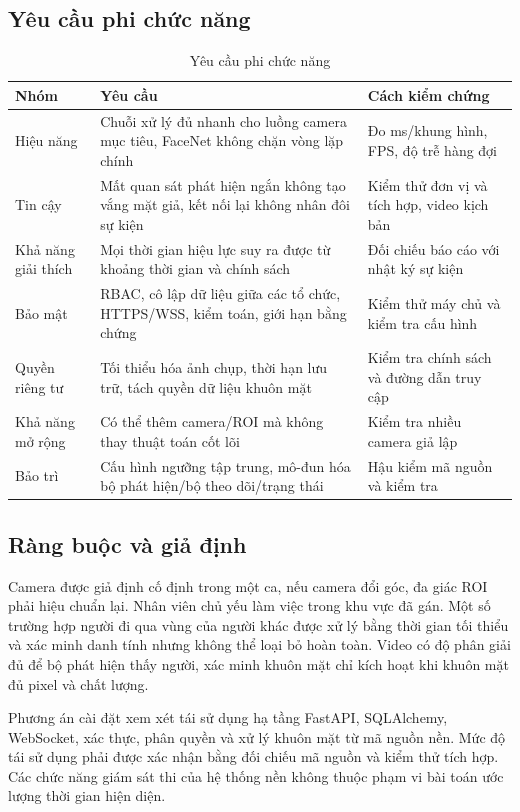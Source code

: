 \subsection{Yêu cầu phi chức năng}
\begin{table}[H]
\centering
\caption{Yêu cầu phi chức năng}
\label{tab:nfr}
\begin{tabularx}{\textwidth}{p{3.5cm}X p{4.5cm}}
\toprule
\textbf{Nhóm} & \textbf{Yêu cầu} & \textbf{Cách kiểm chứng}\\
\midrule
Hiệu năng & Chuỗi xử lý đủ nhanh cho luồng camera mục tiêu, FaceNet không chặn vòng lặp chính & Đo ms/khung hình, FPS, độ trễ hàng đợi\\
Tin cậy & Mất quan sát phát hiện ngắn không tạo vắng mặt giả, kết nối lại không nhân đôi sự kiện & Kiểm thử đơn vị và tích hợp, video kịch bản\\
Khả năng giải thích & Mọi thời gian hiệu lực suy ra được từ khoảng thời gian và chính sách & Đối chiếu báo cáo với nhật ký sự kiện\\
Bảo mật & RBAC, cô lập dữ liệu giữa các tổ chức, HTTPS/WSS, kiểm toán, giới hạn bằng chứng & Kiểm thử máy chủ và kiểm tra cấu hình\\
Quyền riêng tư & Tối thiểu hóa ảnh chụp, thời hạn lưu trữ, tách quyền dữ liệu khuôn mặt & Kiểm tra chính sách và đường dẫn truy cập\\
Khả năng mở rộng & Có thể thêm camera/ROI mà không thay thuật toán cốt lõi & Kiểm tra nhiều camera giả lập\\
Bảo trì & Cấu hình ngưỡng tập trung, mô-đun hóa bộ phát hiện/bộ theo dõi/trạng thái & Hậu kiểm mã nguồn và kiểm tra\\
\bottomrule
\end{tabularx}
\end{table}

\subsection{Ràng buộc và giả định}
Camera được giả định cố định trong một ca, nếu camera đổi góc, đa giác ROI phải hiệu chuẩn lại. Nhân viên chủ yếu làm việc trong khu vực đã gán. Một số trường hợp người đi qua vùng của người khác được xử lý bằng thời gian tối thiểu và xác minh danh tính nhưng không thể loại bỏ hoàn toàn. Video có độ phân giải đủ để bộ phát hiện thấy người, xác minh khuôn mặt chỉ kích hoạt khi khuôn mặt đủ pixel và chất lượng.

Phương án cài đặt xem xét tái sử dụng hạ tầng FastAPI, SQLAlchemy, WebSocket, xác thực, phân quyền và xử lý khuôn mặt từ mã nguồn nền. Mức độ tái sử dụng phải được xác nhận bằng đối chiếu mã nguồn và kiểm thử tích hợp. Các chức năng giám sát thi của hệ thống nền không thuộc phạm vi bài toán ước lượng thời gian hiện diện.


